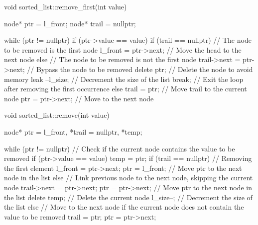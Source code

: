 \documentclass{report}
\begin{document}
    \pagebreak 
    \begin{cppcode}
void sorted_list::remove_first(int value) {
    node* ptr = l_front;
    node* trail = nullptr;

    while (ptr != nullptr) {
        if (ptr->value == value) {
            if (trail == nullptr) {
                // The node to be removed is the first node
                l_front = ptr->next; // Move the head to the next node
            } else {
                // The node to be removed is not the first node
                trail->next = ptr->next; // Bypass the node to be removed
            }
            delete ptr; // Delete the node to avoid memory leak
            --l_size;   // Decrement the size of the list
            break;      // Exit the loop after removing the first occurrence
        } else {
            trail = ptr;      // Move trail to the current node
            ptr = ptr->next;  // Move to the next node
        }
    }
}
    \end{cppcode}
    \pagebreak 
    \begin{cppcode}
void sorted_list::remove(int value)
{
    node* ptr = l_front, *trail = nullptr, *temp;

    while (ptr != nullptr) {
        // Check if the current node contains the value to be removed
        if (ptr->value == value) {
            temp = ptr;
            if (trail == nullptr) {
                // Removing the first element
                l_front = ptr->next;
                ptr = l_front;  // Move ptr to the next node in the list
            } else {
                // Link previous node to the next node, skipping the current node
                trail->next = ptr->next;
                ptr = ptr->next;  // Move ptr to the next node in the list
            }
            delete temp;  // Delete the current node
            l_size--;     // Decrement the size of the list
        } else {
            // Move to the next node if the current node does not contain the value to be removed
            trail = ptr;
            ptr = ptr->next;
        }
    }
}
    \end{cppcode}
\end{document}
